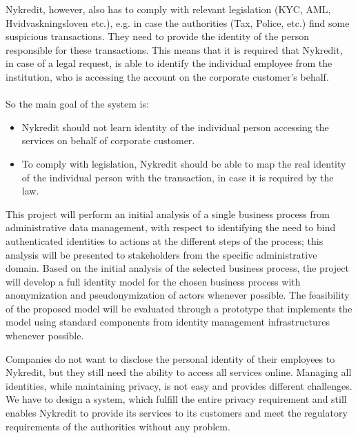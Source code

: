 Nykredit, however, also has to comply with relevant legislation (KYC, AML, Hvidvaskningsloven etc.),  e.g. in case the authorities (Tax, Police, etc.) find some suspicious transactions. They need to provide the identity of the person responsible for these transactions.
This means that it is required that Nykredit, in case of a legal request, is able to identify the individual employee from the institution, who is accessing the account on the corporate customer’s behalf.
\\
\\So the main goal of the system is:
\begin{itemize}
	\item Nykredit should not learn identity of the individual person accessing the services on behalf of corporate customer.
	\item To comply with legislation, Nykredit should be able to map the real identity of the individual person with the transaction, in case it is required by the law.
\end{itemize}
This project will perform an initial analysis of a single business process from administrative data management, with respect to identifying the need to bind authenticated identities to actions at the different steps of the process; this analysis will be presented to stakeholders from the specific administrative domain. Based on the initial analysis of the selected business process, the project will develop a full identity model for the chosen business process with anonymization and pseudonymization of actors whenever possible. The feasibility of the proposed model will be evaluated through a prototype that implements the model using standard components from identity management infrastructures whenever possible.

Companies do not want to disclose the personal identity of their employees to Nykredit, but they still need the ability to access all services online. Managing all identities, while maintaining privacy, is not easy and provides different challenges. We have to design a system, which fulfill the entire privacy requirement and still enables Nykredit to provide its services to its customers and meet the regulatory requirements of the authorities without any problem.
 
